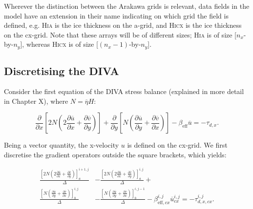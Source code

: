 \documentclass{article}
\begin{document}
Wherever the distinction between the Arakawa grids is relevant, data fields in the model have an extension in their name indicating on which grid the field is defined, e.g. \textsc{Hi\textunderscore a} is the ice thickness on the a-grid, and \textsc{Hi\textunderscore cx} is the ice thickness on the cx-grid. Note that these arrays will be of different sizes; \textsc{Hi\textunderscore a} is of size [$n_x$-by-$n_y$], whereas \textsc{Hi\textunderscore cx} is of size [$\left( n_x - 1 \right)$-by-$n_y$].

\subsection{Discretising the DIVA}

Consider the first equation of the DIVA stress balance (explained in more detail in Chapter X), where $N = \overline{\eta} H$:

\begin{equation}\label{eq:DIVA_disc_01}
\frac{\partial}{\partial x} \left[ 2 N \left( 2 \frac{\partial \overline{u}}{\partial x} + 
\frac{\partial \overline{v}}{\partial y} \right) \right] + 
\frac{\partial}{\partial y} \left[ N \left( \frac{\partial \overline{u}}{\partial y} + 
\frac{\partial \overline{v}}{\partial x} \right) \right] - \beta_{\textrm{eff}} \overline{u} = -\tau_{d,x}.
\end{equation}

Being a vector quantity, the x-velocity $u$ is defined on the cx-grid. We first discretise the gradient operators outside the square brackets, which yields:

\begin{equation} \label{eq:DIVA_disc_02}
\begin{split}
\frac{ { \left[ 2 N \left( 2 \frac{\partial \overline{u} }{\partial x} +
\frac{\partial \overline{v}}{\partial y} \right) \right] }_a^{i+1,j} }{\Delta} &-
\frac{ { \left[ 2 N \left( 2 \frac{\partial \overline{u} }{\partial x} +
\frac{\partial \overline{v}}{\partial y} \right) \right] }_a^{i,j} }{\Delta} + \\
\frac{ { \left[ N \left( \frac{\partial \overline{u} }{\partial y} +
\frac{\partial \overline{v}}{\partial x} \right) \right] }_b^{i,j} }{\Delta} &-
\frac{ { \left[ N \left( \frac{\partial \overline{u} }{\partial y} +
\frac{\partial \overline{v}}{\partial x} \right) \right] }_b^{i,j-1} }{\Delta}
- \beta_{\textrm{eff},cx}^{i,j} \overline{u}_{cx}^{i,j} = -\tau_{d,x,cx}^{i,j}.
\end{split}
\end{equation}
\end{document}
